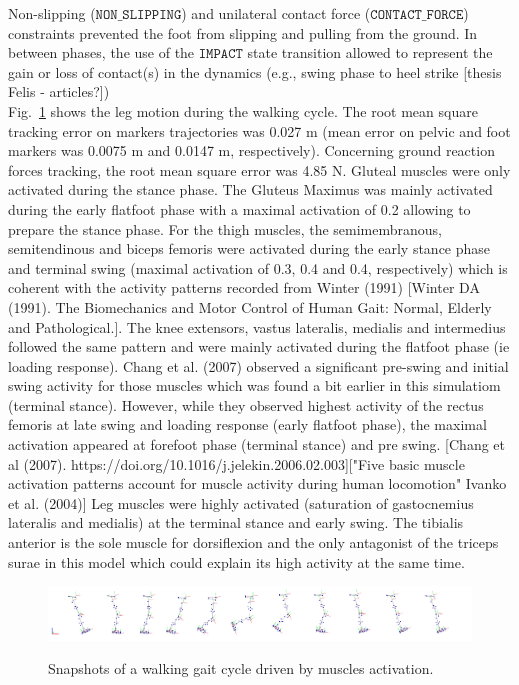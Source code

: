 Non-slipping ($\mathtt{NON\_SLIPPING}$) and unilateral contact force ($\mathtt{CONTACT\_FORCE}$) constraints prevented the foot from slipping and pulling from the ground. 
In between phases, the use of the $\mathtt{IMPACT}$ state transition allowed to represent the gain or loss of contact(s) in the dynamics (e.g., swing phase to heel strike [thesis Felis - articles?]) \\

Fig.~\ref{fig:snapshots_multiphase_walking_cycle} shows the leg motion during the walking cycle. 
The root mean square tracking error on markers trajectories was 0.027 m (mean error on pelvic and foot markers was 0.0075 m and 0.0147 m, respectively). 
Concerning ground reaction forces tracking, the root mean square error was 4.85 N.
Gluteal muscles were only activated during the stance phase. The Gluteus Maximus was mainly activated during the early flatfoot phase with a maximal activation of 0.2 allowing to prepare the stance phase. 
For the thigh muscles, the semimembranous, semitendinous and biceps femoris were activated during the early stance phase and terminal swing (maximal activation of 0.3, 0.4 and 0.4, respectively) which is coherent with the activity patterns recorded from Winter (1991) [Winter DA (1991). The Biomechanics and Motor Control of Human Gait: Normal, Elderly and Pathological.].  
The knee extensors, vastus lateralis, medialis and intermedius followed the same pattern and were mainly activated during the flatfoot phase (ie loading response). Chang et al. (2007) observed a significant pre-swing and initial swing activity for those muscles which was found a bit earlier in this simulatiom (terminal stance).
However, while they observed highest activity of the rectus femoris at late swing and loading response (early flatfoot phase), the maximal activation appeared at  forefoot phase (terminal stance) and pre swing. [Chang et al (2007). https://doi.org/10.1016/j.jelekin.2006.02.003]["Five basic muscle activation patterns account for muscle activity during human locomotion" Ivanko et al. (2004)] 
Leg muscles were highly activated (saturation of gastocnemius lateralis and medialis) at the terminal stance and early swing. The tibialis anterior is the sole muscle for dorsiflexion and the only antagonist of the triceps surae in this model which could explain its high activity at the same time. 

\begin{figure}[t!]
\centering
\includegraphics[width=\textwidth]{figures/multiphase_walking_cycle.png}\\
\caption{Snapshots of a walking gait cycle driven by muscles activation.}
\label{fig:snapshots_multiphase_walking_cycle}
\end{figure}
